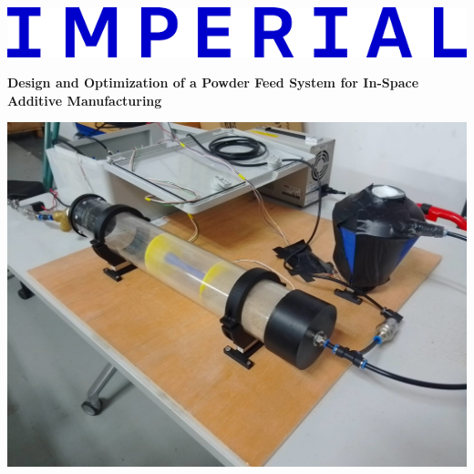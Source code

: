 \documentclass[11pt,a4paper]{report}
\begin{document}
\begin{titlepage}

    \noindent
    \begin{minipage}{0.5\textwidth}
        \includegraphics[width=\linewidth]{../report_assets/imperial.png}
    \end{minipage}
    \hfill
    
    \vspace{1cm} %
    \begin{center}
        {\huge \textbf{Design and Optimization of a Powder Feed System for In-Space Additive Manufacturing}}\\[1cm]
        
        \begin{minipage}{0.9\textwidth}
            \includegraphics[width=\linewidth]{../report_assets/cover_image.png}
        \end{minipage}
        \hfill
        
        \vspace{0.3cm} %


\end{center}
\end{titlepage}
\end{document}
